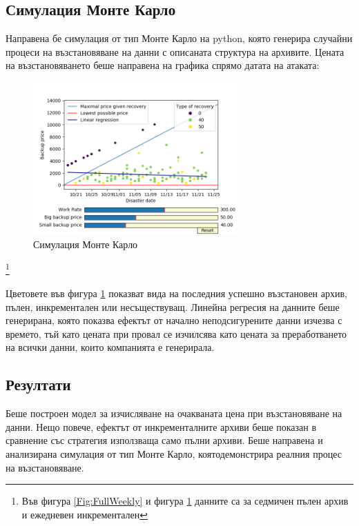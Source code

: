 \documentclass[11pt, a4paper]{article}
\theoremstyle{definition}
\newcommand\blfootnote[1]{%
	\begingroup
	\renewcommand\thefootnote{}\footnote{#1}%
	\addtocounter{footnote}{-1}%
	\endgroup
}
\begin{document}
		\subsection{Симулация Монте Карло}
			Направена бе симулация от тип Монте Карло на python, която генерира случайни процеси на възстановяване на данни с описаната структура на архивите. Цената на възстановяването беше направена на графика спрямо датата на атаката:
			\begin{figure}[H]
				\begin{minipage}{1.0\textwidth}
					\centering
					\includegraphics[width=0.7\textwidth]{Weekly_full_carlo.png}
					\caption{Симулация Монте Карло}\label{Fig:MonteCarlo}
				\end{minipage}
			\end{figure}
			\blfootnote{Във фигура \ref{Fig:FullWeekly} и фигура \ref{Fig:MonteCarlo} данните са за седмичен пълен архив и ежедневен инкрементален}
			Цветовете във фигура \ref{Fig:MonteCarlo} показват вида на последния успешно възстановен архив, пълен, инкрементален или несъществуващ.
			\newpage
			Линейна регресия на данните беше генерирана, която показва ефектът от начално неподсигурените данни изчезва с времето, тъй като цената при провал се изчилсява като цената за преработването на всички данни, които компанията е генерирала.
		\subsection{Резултати}
			Беше построен модел за изчисляване на очакваната цена при възстановяване на данни. Нещо повече, ефектът от инкременталните архиви беше показан в сравнение със стратегия използваща само пълни архиви. Беше направена и анализирана симулация от тип Монте Карло, коятодемонстрира реалния процес на възстановяване.
\end{document}
